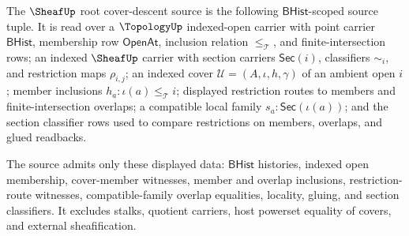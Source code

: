 \begin{definition}
\label{def:sheaf-root-cover-descent-source}
The $\SheafUp$ root cover-descent source is the following $\mathsf{BHist}$-scoped source tuple. It is read over a $\TopologyUp$ indexed-open carrier with point carrier $\mathsf{BHist}$, membership row $\mathsf{OpenAt}$, inclusion relation $\le_{\mathcal{T}}$, and finite-intersection rows; an indexed $\SheafUp$ carrier with section carriers $\mathsf{Sec}(i)$, classifiers $\sim_i$, and restriction maps $\rho_{i,j}$; an indexed cover $\mathcal{U}=(A,\iota,h,\gamma)$ of an ambient open $i$; member inclusions $h_a:\iota(a)\le_{\mathcal{T}}i$; displayed restriction routes to members and finite-intersection overlaps; a compatible local family $s_a:\mathsf{Sec}(\iota(a))$; and the section classifier rows used to compare restrictions on members, overlaps, and glued readbacks.

The source admits only these displayed data: $\mathsf{BHist}$ histories, indexed open membership, cover-member witnesses, member and overlap inclusions, restriction-route witnesses, compatible-family overlap equalities, locality, gluing, and section classifiers. It excludes stalks, quotient carriers, host powerset equality of covers, and external sheafification.
\end{definition}

